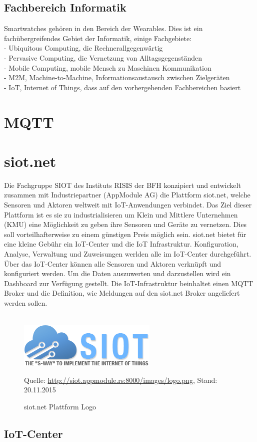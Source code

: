 \subsection{Fachbereich Informatik}
Smartwatches gehören in den Bereich der Wearables. Dies ist ein fachübergreifendes Gebiet der Informatik, einige Fachgebiete:\\
- Ubiquitous Computing, die Rechnerallgegenwärtig \\
- Pervasive Computing, die Vernetzung von Alltagsgegenständen \\
- Mobile Computing, mobile Mensch zu Maschinen Kommunikation \\
- M2M, Machine-to-Machine, Informationsaustausch zwischen Zielgeräten \\
- IoT, Internet of Things, dass auf den vorhergehenden Fachbereichen basiert

\section{MQTT}

\section{siot.net}

Die Fachgruppe SIOT des Instituts RISIS der BFH konzipiert und entwickelt zusammen mit Industriepartner (AppModule AG) die Plattform siot.net, welche Sensoren und Aktoren weltweit mit IoT-Anwendungen verbindet.
Das Ziel dieser Plattform ist es sie zu industrialisieren um Klein und Mittlere Unternehmen (KMU) eine Möglichkeit zu geben ihre Sensoren und Geräte zu vernetzen. Dies soll vorteilhafterweise zu einem günstigen Preis möglich sein.
siot.net bietet für eine kleine Gebühr ein IoT-Center und die IoT Infrastruktur.
Konfiguration, Analyse, Verwaltung und Zuweisungen werlden alle im IoT-Center durchgeführt. Über das IoT-Center können alle Sensoren und Aktoren verknüpft und konfiguriert werden. Um die Daten auszuwerten und darzustellen wird ein Dashboard zur Verfügung gestellt. Die IoT-Infrastruktur beinhaltet einen MQTT Broker und die Definition, wie Meldungen auf den siot.net Broker angeliefert werden sollen.\\\\
\begin{figure}[h]
  \centering
  \includegraphics[scale=1.0]{98_Bilder/02_Grundlagen/siotnetLogo}
  \caption[siot.net Logo]{siot.net Plattform Logo}
  \footnotesize Quelle: \url{http://siot.appmodule.rs:8000/images/logo.png}, Stand: 20.11.2015
\end{figure}
\subsection{IoT-Center}
